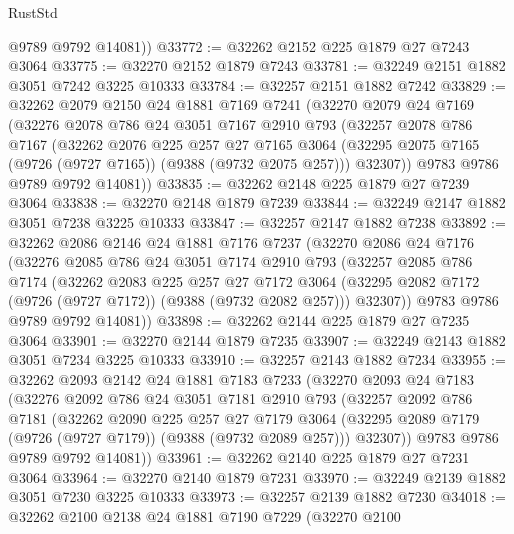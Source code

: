 \begin{lexlean}{RustStd}
\begin{coremodule}
        @9789
        @9792
        @14081))
@33772 := @32262 @2152 @225 @1879 @27 @7243 @3064
@33775 := @32270 @2152 @1879 @7243
@33781 := @32249 @2151 @1882 @3051 @7242 @3225 @10333
@33784 := @32257 @2151 @1882 @7242
@33829 := @32262
    @2079
    @2150
    @24
    @1881
    @7169
    @7241
    (@32270
      @2079
      @24
      @7169
      (@32276
        @2078
        @786
        @24
        @3051
        @7167
        @2910
        @793
        (@32257
          @2078
          @786
          @7167
          (@32262
            @2076
            @225
            @257
            @27
            @7165
            @3064
            (@32295 @2075 @7165 (@9726 (@9727 @7165)) (@9388 (@9732 @2075 @257)))
            @32307))
        @9783
        @9786
        @9789
        @9792
        @14081))
@33835 := @32262 @2148 @225 @1879 @27 @7239 @3064
@33838 := @32270 @2148 @1879 @7239
@33844 := @32249 @2147 @1882 @3051 @7238 @3225 @10333
@33847 := @32257 @2147 @1882 @7238
@33892 := @32262
    @2086
    @2146
    @24
    @1881
    @7176
    @7237
    (@32270
      @2086
      @24
      @7176
      (@32276
        @2085
        @786
        @24
        @3051
        @7174
        @2910
        @793
        (@32257
          @2085
          @786
          @7174
          (@32262
            @2083
            @225
            @257
            @27
            @7172
            @3064
            (@32295 @2082 @7172 (@9726 (@9727 @7172)) (@9388 (@9732 @2082 @257)))
            @32307))
        @9783
        @9786
        @9789
        @9792
        @14081))
@33898 := @32262 @2144 @225 @1879 @27 @7235 @3064
@33901 := @32270 @2144 @1879 @7235
@33907 := @32249 @2143 @1882 @3051 @7234 @3225 @10333
@33910 := @32257 @2143 @1882 @7234
@33955 := @32262
    @2093
    @2142
    @24
    @1881
    @7183
    @7233
    (@32270
      @2093
      @24
      @7183
      (@32276
        @2092
        @786
        @24
        @3051
        @7181
        @2910
        @793
        (@32257
          @2092
          @786
          @7181
          (@32262
            @2090
            @225
            @257
            @27
            @7179
            @3064
            (@32295 @2089 @7179 (@9726 (@9727 @7179)) (@9388 (@9732 @2089 @257)))
            @32307))
        @9783
        @9786
        @9789
        @9792
        @14081))
@33961 := @32262 @2140 @225 @1879 @27 @7231 @3064
@33964 := @32270 @2140 @1879 @7231
@33970 := @32249 @2139 @1882 @3051 @7230 @3225 @10333
@33973 := @32257 @2139 @1882 @7230
@34018 := @32262
    @2100
    @2138
    @24
    @1881
    @7190
    @7229
    (@32270
      @2100

\end{coremodule}
\end{lexlean}
